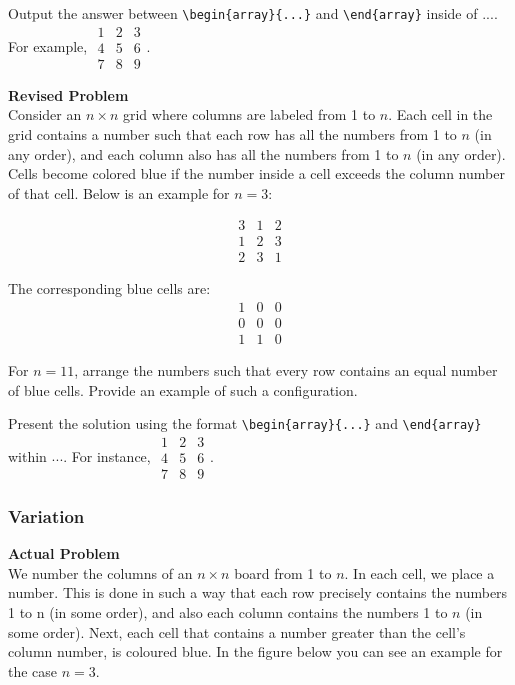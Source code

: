 Output the answer between \verb|\begin{array}{...}| and \verb|\end{array}| inside of $\boxed{...}$. For example, $\boxed{\begin{array}{ccc}1 & 2 & 3 \\ 4 & 5 & 6 \\ 7 & 8 & 9\end{array}}$.

\textbf{Revised Problem}\\
Consider an \( n \times n \) grid where columns are labeled from 1 to \( n \). Each cell in the grid contains a number such that each row has all the numbers from 1 to \( n \) (in any order), and each column also has all the numbers from 1 to \( n \) (in any order). Cells become colored blue if the number inside a cell exceeds the column number of that cell. Below is an example for \( n = 3 \):

$$\begin{array}{ccc}
3 & 1 & 2 \\
1 & 2 & 3 \\
2 & 3 & 1
\end{array}$$

The corresponding blue cells are:
$$\begin{array}{ccc}
1 & 0 & 0 \\
0 & 0 & 0 \\
1 & 1 & 0
\end{array}$$

For \( n = 11 \), arrange the numbers such that every row contains an equal number of blue cells. Provide an example of such a configuration.

Present the solution using the format \verb|\begin{array}{...}| and \verb|\end{array}| within $\boxed{...}$. For instance, $\boxed{\begin{array}{ccc}1 & 2 & 3 \\ 4 & 5 & 6 \\ 7 & 8 & 9\end{array}}$.

\subsubsection{Variation}
\textbf{Actual Problem}\\
We number the columns of an $n \times n$ board from 1 to $n$. In each cell, we place a number. This is done in such a way that each row precisely contains the numbers 1 to n (in some order), and also each column contains the numbers 1 to $n$ (in some order). Next, each cell that contains a number greater than the cell’s column number, is coloured blue. In the figure below you can see an example for the case $n = 3$.

